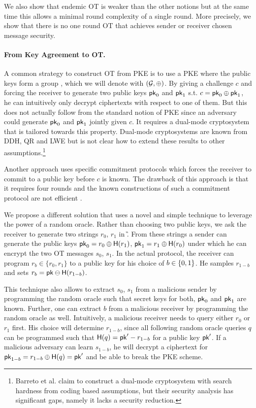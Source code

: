 We also show that endemic OT is weaker than the other notions but at the same time this allows a minimal round complexity of a single round. More precisely, we show that there is no one round OT that achieves sender or receiver chosen message security.

\paragraph{From Key Agreement to OT.} A common strategy to construct OT from PKE is to use a PKE where the public keys form a group \cite{C:PeiVaiWat08}, which we will denote with $(\mathcal{G},\oplus)$. By giving a challenge $c$ and forcing the receiver to generate two public keys $\mathsf{pk}_0$ and $\mathsf{pk}_1$ s.t. $c=\mathsf{pk}_0\oplus \mathsf{pk}_1$, he can intuitively only decrypt ciphertexts with respect to one of them. But this does not actually follow from the standard notion of PKE since an adversary could generate $\mathsf{pk}_0$ and $\mathsf{pk}_1$ jointly given $c$. It requires a dual-mode cryptosystem \cite{C:PeiVaiWat08} that is tailored towards this property. Dual-mode cryptosystems are known from DDH, QR and LWE \cite{C:PeiVaiWat08} but is not clear how to extend these results to other assumptions.\footnote{Barreto et al. \cite{EPRINT:BDDMN17b} claim to construct a dual-mode cryptosystem with search hardness from coding based assumptions, but their security analysis has significant gaps, namely it lacks a security reduction.}

Another approach \cite{C:OstRicSca15,cryptoeprint:2018:473} uses specific commitment protocols which forces the receiver to commit to a public key before $c$ is known. The drawback of this approach is that it requires four rounds and the known constructions of such a commitment protocol are not efficient \cite{STOC:Kilian92,C:OstRicSca15}. 

We propose a different solution that uses a novel and simple technique to leverage the power of a random oracle. Rather than choosing two public keys, we ask the receiver to generate two strings $r_0$, $r_1$ in \G. From these strings a sender can generate the public keys $\mathsf{pk}_0=r_0\oplus\mathsf{H}(r_1)$, $\mathsf{pk}_1=r_1\oplus\mathsf{H}(r_0)$ under which he can encrypt the two OT messages $s_0$, $s_1$.
In the actual protocol, the receiver can program $r_b\in \{r_0,r_1\}$ to a public key 
for his choice of $b\in\{0,1\}$. He samples $r_{1-b}$ and sets $r_b=\mathsf{pk}\ominus\mathsf{H}(r_{1-b})$.

This technique also allows to extract $s_0$, $s_1$ from a malicious sender by programming the random oracle such that secret keys for both, $\mathsf{pk}_0$ and $\mathsf{pk}_1$ are known. Further, one can extract $b$ from a malicious receiver by programming the random oracle as well. Intuitively, a malicious receiver needs to query either $r_0$ or $r_1$ first. His choice will determine $r_{1-b}$, since all following random oracle queries $q$ can be programmed such that $\mathsf{H}(q)=\mathsf{pk}'-r_{1-b}$ for a public key $\mathsf{pk}'$. If a malicious adversary can learn $s_{1-b}$, he will decrypt a ciphertext for $\mathsf{pk}_{1-b}=r_{1-b}\oplus\mathsf{H}(q)=\mathsf{pk}'$ and be able to break the PKE scheme.


